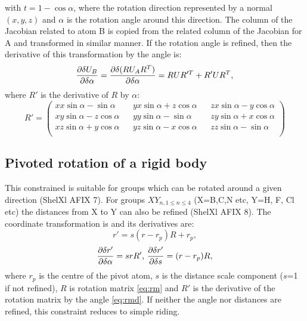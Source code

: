 \documentclass[pdf]{iucr}
\begin{document}
with $t=1-\cos \alpha$, where the rotation direction represented by a normal $(x,y,z)$ and $\alpha$ is the rotation angle around this direction. The column of the Jacobian related to atom B is copied from the related column of the Jacobian for A and transformed in similar manner. If the rotation angle is refined, then the derivative of this transformation by the angle is:
\begin{equation}
\frac{\partial \delta U_{B}}{\partial \delta\alpha} = \frac{\partial \delta(RU_{A}R^{T})}{\partial \delta\alpha} = RUR'^{T} + R'UR^{T},
\end{equation}
where $R'$ is the derivative of $R$ by $\alpha$:
\begin{equation}
R' = 
  \begin{pmatrix} \label{eq:rmd}
    xx\sin\alpha - \sin\alpha && yx\sin\alpha + z\cos\alpha && zx\sin\alpha - y\cos\alpha \\
    xy\sin\alpha - z\cos\alpha && yy\sin\alpha - \sin\alpha && zy\sin\alpha + x\cos\alpha \\
    xz\sin\alpha + y\cos\alpha && yz\sin\alpha - x\cos\alpha && zz\sin\alpha - \sin\alpha \\
  \end{pmatrix}
\end{equation}

\subsection{Pivoted rotation of a rigid body}
\label{sec:pivoted_rotated_group}
This constrained is suitable for groups which can be rotated around a given direction (ShelXl AFIX 7). For groups $XY_{n, 1\leq n \leq 4}$ (X=B,C,N etc, Y=H, F, Cl etc) the distances from X to Y can also be refined (ShelXl AFIX 8). The coordinate transformation is and its derivatives are:
\begin{equation}
r' = s(r-r_{p})R + r_{p},
\end{equation}
\begin{equation}
\frac{\partial \delta r'}{\partial \delta \alpha} = srR' \text{, } \frac{\partial \delta r'}{\partial \delta s} = (r-r_{p})R,
\end{equation}
where $r_{p}$ is the centre of the pivot atom, $s$ is the distance scale component ($s$=1 if not refined), $R$ is rotation matrix \ref{eq:rm} and $R'$ is the derivative of the rotation matrix by the angle \ref{eq:rmd}. If neither the angle nor distances are refined, this constraint reduces to simple riding.
\end{document}
